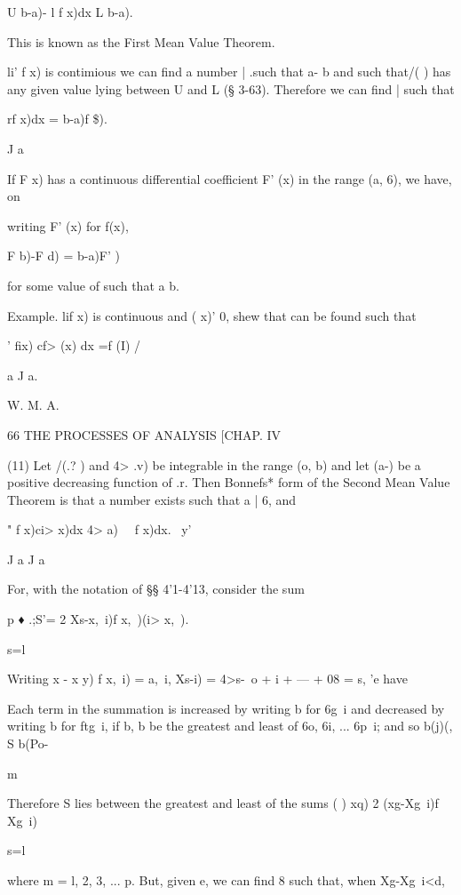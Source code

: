 U b-a)- l f x)dx L b-a).

This is known as the First Mean Value Theorem.

li' f x) is contimious we can find a number | .such that a- b and such
that/( ) has any given value lying between U and L (§ 3-63). Therefore
we can find | such that



rf x)dx = b-a)f \$).

J a



If F x) has a continuous differential coefficient F' (x) in the range
(a, 6), we have, on

writing F' (x) for f(x),

F b)-F d) = b-a)F' )

for some value of such that a b.

Example. lif x) is continuous and ( x)' 0, shew that can be found such
that



' fix) cf> (x) dx =f (I) / %

a J a.



W. M. A.



66 THE PROCESSES OF ANALYSIS [CHAP. IV

(11) Let /(.? ) and 4> .v) be integrable in the range (o, b) and let
(a-) be a positive decreasing function of .r. Then Bonnefs* form of
the Second Mean Value Theorem is that a number exists such that a | 6,
and

 " f x)ci> x)dx 4> a) \ \ f x)dx. \ y'

J a J a

For, with the notation of §§ 4'1-4'13, consider the sum

p ♦ .;S'= 2 Xs-x,\ i)f x,\ )(i> x,\ ).

s=l

Writing x - x y) f x,\ i) = a,\ i, Xs-i) = 4>s-\, o + i + --- + 08 =
s, 'e have

Each term in the summation is increased by writing b for 6g\ i and
decreased by writing b for ftg\ i, if b, b be the greatest and least
of 6o, 6i, ... 6p\ i; and so b(j)(, S b(Po-

m

Therefore S lies between the greatest and least of the sums ( ) xq) 2
(xg-Xg\ i)f Xg\ i)

s=l

where m = l, 2, 3, ... p. But, given e, we can find 8 such that, when
Xg-Xg\ i<d,

